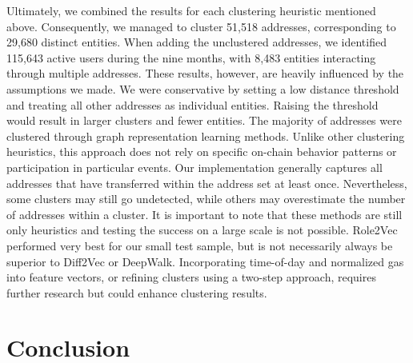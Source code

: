\documentclass[12pt,a4paper,titlepage,oneside,english]{article}
\begin{document}
Ultimately, we combined the results for each clustering heuristic mentioned above. Consequently, we managed to cluster 51,518 addresses, corresponding to 29,680 distinct entities. When adding the unclustered addresses, we identified 115,643 active users during the nine months, with 8,483 entities interacting through multiple addresses. \newline
These results, however, are heavily influenced by the assumptions we made. We were conservative by setting a low distance threshold and treating all other addresses as individual entities. Raising the threshold would result in larger clusters and fewer entities. \newline 
The majority of addresses were clustered through graph representation learning methods. Unlike other clustering heuristics, this approach does not rely on specific on-chain behavior patterns or participation in particular events. Our implementation generally captures all addresses that have transferred within the address set at least once. Nevertheless, some clusters may still go undetected, while others may overestimate the number of addresses within a cluster. It is important to note that these methods are still only heuristics and testing the success on a large scale is not possible. \newline
Role2Vec performed very best for our small test sample, but is not necessarily always be superior to Diff2Vec or DeepWalk. Incorporating time-of-day and normalized gas into feature vectors, or refining clusters using a two-step approach, requires further research but could enhance clustering results.


\section{Conclusion}

\end{document}
